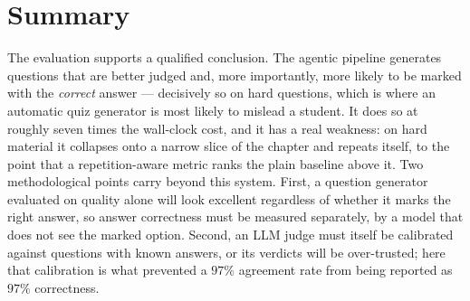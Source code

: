 \section{Summary}
\label{sec:res-summary}

The evaluation supports a qualified conclusion. The agentic pipeline generates
questions that are better judged and, more importantly, more likely to be marked with
the \emph{correct} answer --- decisively so on hard questions, which is where an
automatic quiz generator is most likely to mislead a student. It does so at roughly
seven times the wall-clock cost, and it has a real weakness: on hard material it
collapses onto a narrow slice of the chapter and repeats itself, to the point that a
repetition-aware metric ranks the plain baseline above it. Two methodological points
carry beyond this system. First, a question generator evaluated on quality alone will
look excellent regardless of whether it marks the right answer, so answer correctness
must be measured separately, by a model that does not see the marked option. Second,
an LLM judge must itself be calibrated against questions with known answers, or its
verdicts will be over-trusted; here that calibration is what prevented a $97\%$
agreement rate from being reported as $97\%$ correctness.
